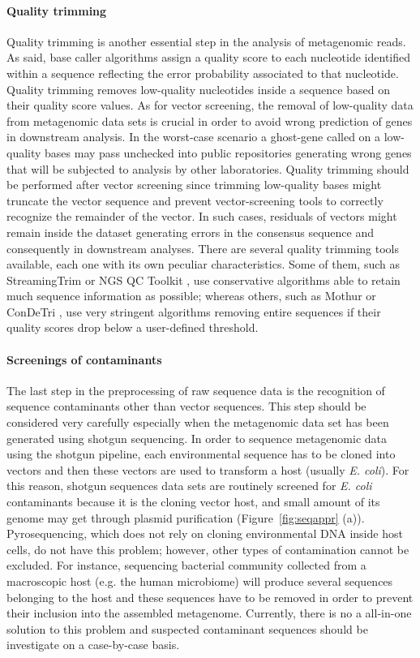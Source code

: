 \paragraph{Quality trimming}
Quality trimming is another essential step in the analysis of metagenomic reads. As said, base caller algorithms assign a quality score to each nucleotide identified within a sequence reflecting the error probability associated to that nucleotide. Quality trimming removes low-quality nucleotides inside a sequence based on their quality score values. As for vector screening, the removal of low-quality data from metagenomic data sets is crucial in order to avoid wrong prediction of genes in downstream analysis. In the worst-case scenario a ghost-gene called on a low-quality bases may pass unchecked into public repositories generating wrong genes that will be subjected to analysis by other laboratories. Quality trimming should be performed after vector screening since trimming low-quality bases might truncate the vector sequence and prevent vector-screening tools to correctly recognize the remainder of the vector. In such cases, residuals of vectors might remain inside the dataset generating errors in the consensus sequence and consequently in downstream analyses. There are several quality trimming tools available, each one with its own peculiar characteristics. Some of them, such as StreamingTrim \cite{bacci2014streamingtrim} or NGS QC Toolkit \cite{patel2012ngs}, use conservative algorithms able to retain much sequence information as possible; whereas others, such as Mothur \cite{schloss2009introducing} or ConDeTri \cite{smeds2011condetri}, use very stringent algorithms removing entire sequences if their quality scores drop below a user-defined threshold.

\paragraph{Screenings of contaminants}
The last step in the preprocessing of raw sequence data is the recognition of sequence contaminants other than vector sequences. This step should be considered very carefully especially when the metagenomic data set has been  generated using shotgun sequencing. In order to sequence metagenomic data using the shotgun pipeline, each environmental sequence has to be cloned into vectors and then these vectors are used to transform a host (usually \textit{E. coli}). For this reason, shotgun sequences data sets are routinely screened for \textit{E. coli} contaminants because it is the cloning vector host, and small amount of its genome may get through plasmid purification (Figure~\ref{fig:seqappr} (a)). Pyrosequencing, which does not rely on cloning environmental DNA inside host cells, do not have this problem; however, other types of contamination cannot be excluded. For instance, sequencing bacterial community collected from a macroscopic host (e.g. the human microbiome) will produce several sequences belonging to the host and these sequences have to be removed in order to prevent their inclusion into the assembled metagenome. Currently, there is no a all-in-one solution to this problem and suspected contaminant sequences should be investigate on a case-by-case basis.

